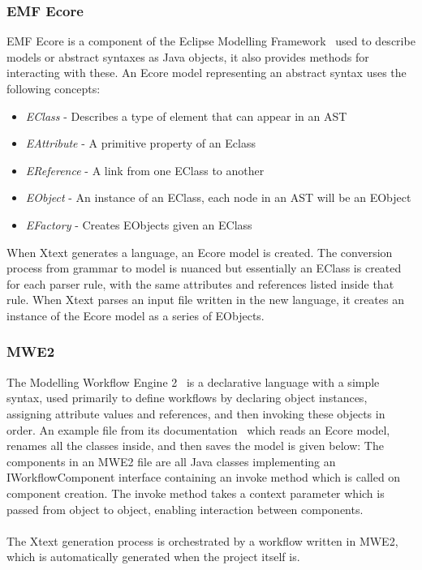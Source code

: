 \documentclass{article}
\begin{document}
\subsubsection{EMF Ecore}\label{emf}
EMF Ecore is a component of the Eclipse Modelling Framework~\cite{emf} used to describe models or abstract syntaxes as Java objects, it also provides methods for interacting with these. An Ecore model representing an abstract syntax uses the following concepts:
\begin{itemize}
\item \emph{EClass} - Describes a type of element that can appear in an AST
\item \emph{EAttribute} - A primitive property of an Eclass
\item \emph{EReference} - A link from one EClass to another
\item \emph{EObject} - An instance of an EClass, each node in an AST will be an EObject
\item \emph{EFactory} - Creates EObjects given an EClass
\end{itemize}
When Xtext generates a language, an Ecore model is created. The conversion process from grammar to model is nuanced but essentially an EClass is created for each parser rule, with the same attributes and references listed inside that rule. When Xtext parses an input file written in the new language, it creates an instance of the Ecore model as a series of EObjects.
\subsubsection{MWE2}
The Modelling Workflow Engine 2~\cite{mwe2} is a declarative language with a simple syntax, used primarily to define workflows by declaring object instances, assigning attribute values and references, and then invoking these objects in order. An example file from its documentation~\cite{mwe2} which reads an Ecore model, renames all the classes inside, and then saves the model is given below: 
The components in an MWE2 file are all Java classes implementing an IWorkflowComponent interface containing an invoke method which is called on component creation. The invoke method takes a context parameter which is passed from object to object, enabling interaction between components.
\\
\\
The Xtext generation process is orchestrated by a workflow written in MWE2, which is automatically generated when the project itself is.
\end{document}
